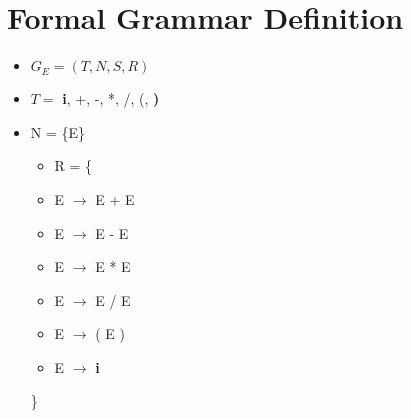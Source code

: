 \documentclass{article}
\begin{document}
\section{Formal Grammar Definition}

\begin{flushleft}

\begin{itemize}
\item $G_{E} = (T, N, S, R)$ \\

\item $T = $ {\textbf{i}, +, -, *, /, (, \textbf{)}} \\

\item N = \{E\} \\

\begin{itemize}
\item R = \{ \\ 
\item \hspace{10mm} E $\rightarrow$ E + E \\
\item \hspace{10mm} E $\rightarrow$ E - E \\
\item \hspace{10mm} E $\rightarrow$ E * E \\
\item \hspace{10mm} E $\rightarrow$ E / E \\
\item \hspace{10mm} E $\rightarrow$ ( E ) \\
\item \hspace{10mm} E $\rightarrow$ \textbf{i} \\
\end{itemize}
\}
\end{itemize}
\end{flushleft}
\end{document}
